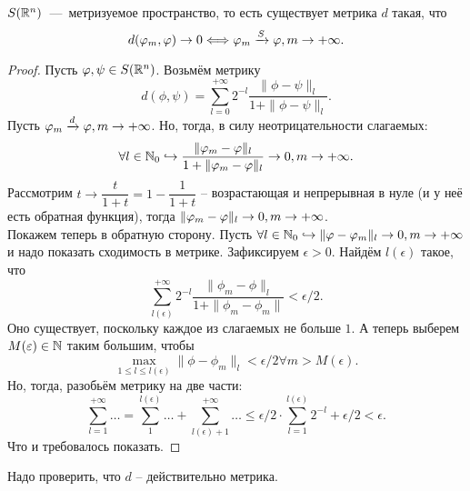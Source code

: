 \begin{theorem}
    $S(\mathbb{R}^n)$~---~метризуемое пространство, то есть существует метрика $d$ такая, что \[d(\varphi_m, \varphi) \rightarrow 0 \Longleftrightarrow \varphi_m \xrightarrow{S} \varphi, m \rightarrow +\infty.\]
\end{theorem}
\begin{proof}
    Пусть $\varphi, \psi \in S(\mathbb{R}^n)$.
    Возьмём метрику
    \[
        d(\phi, \psi) = \sum\limits_{l = 0}^{+\infty} 2^{-l} \dfrac{\|\phi - \psi\|_l}{1 + \|\phi - \psi\|_l}.
    \]
    Пусть $\varphi_m \xrightarrow{d} \varphi, m \rightarrow +\infty$.
    Но, тогда, в силу неотрицательности слагаемых:
    \[
        \forall l \in \mathbb{N}_{0} \hookrightarrow \dfrac{\|\varphi_m - \varphi\|_l}{1 + \|\varphi_m - \varphi\|_l} \rightarrow 0, m \rightarrow +\infty.
    \]
    Рассмотрим $t \to \dfrac{t}{1 + t} = 1 - \dfrac{1}{1 + t}$ -- возрастающая и непрерывная в нуле (и у неё есть обратная функция),
    тогда $\|\varphi_m - \varphi\|_l \rightarrow 0, m \rightarrow +\infty$. \\
    Покажем теперь в обратную сторону.
    Пусть $\forall l \in \mathbb{N}_0 \hookrightarrow \|\varphi - \varphi_m\|_l \rightarrow 0, m \rightarrow +\infty$ и надо показать сходимость в метрике.
    Зафиксируем $\epsilon > 0$.
    Найдём $l(\epsilon)$ такое, что
    \[
        \sum\limits_{l(\epsilon)}^{+\infty} 2^{-l} \dfrac{\|\phi_m - \phi\|_l}{1 + \|\phi_m - \phi_m\|} < \epsilon/2.
    \]
    Оно существует, поскольку каждое из слагаемых не больше $1$.
    А теперь выберем $M(\varepsilon) \in \mathbb{N}$ таким большим, чтобы
    \[
        \max\limits_{1 \leq l \leq l(\epsilon)} \|\phi - \phi_m\|_l < \epsilon/2 \forall m > M(\epsilon).
    \]
    Но, тогда, разобьём метрику на две части:
    \[
        \sum\limits_{l = 1}^{+\infty} \ldots = \sum\limits_{1}^{l(\epsilon)} \ldots + \sum\limits_{l(\epsilon) + 1}^{+\infty} \ldots \leq \epsilon/2 \cdot\sum\limits_{l = 1}^{l(\epsilon)} 2^{-l} + \epsilon/2 < \epsilon.
    \]
    Что и требовалось показать.
\end{proof}


\begin{note}
    Надо проверить, что $d$ -- действительно метрика.
\end{note}

